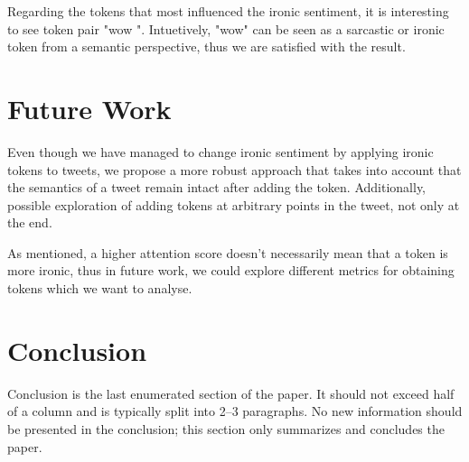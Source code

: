 \documentclass[10pt, a4paper]{article}
\begin{document}
Regarding the tokens that most influenced the ironic sentiment, it is interesting to see token pair "wow \textvisiblespace ".
Intuetively, "wow" can be seen as a sarcastic or ironic token from a semantic perspective, thus we are satisfied with the result.

\section{Future Work}

Even though we have managed to change ironic sentiment by applying ironic tokens to tweets, we propose a more robust approach that takes into account that the semantics of a tweet remain intact after adding the token.
Additionally, possible exploration of adding tokens at arbitrary points in the tweet, not only at the end.

As mentioned, a higher attention score doesn't necessarily mean that a token is more ironic, thus in future work, we could explore different metrics for obtaining tokens which we want to analyse.

\section{Conclusion}

Conclusion is the last enumerated section of the paper. It should not exceed half of a column and is typically split into 2--3 paragraphs. No new information should be presented in the conclusion; this section only summarizes and concludes the paper.


 
\end{document}
